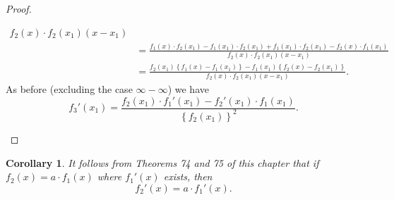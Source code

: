 \documentclass[a4paper,12pt]{book}[2004/02/16]
\providecommand{\colorbox}[2]{#2}
\newcommand{\correction}[2]{\colorbox{corr}{#1}}
\providecommand{\hyperlink}[2]{#2}
\theoremstyle{ilemma}
\theoremstyle{itheorem}
\theoremstyle{iother}
\theoremstyle{icorollary}
\newtheorem{corollary}{Corollary}
\theoremstyle{numcorollary}
\theoremstyle{idefinition}
\begin{document}
\begin{proof}
\begin{enumerate}
\begin{align*}
       {f_2(x)\cdot f_2(x_1) (x-x_1)}
\\
  &= \frac{f_1(x )\cdot f_2(x_1)-f_1(x_1)\cdot f_2(x_1)
       + f_1(x_1)\cdot f_2(x_1)-f_2(x )\cdot f_1(x_1)}
       {f_2(x)\cdot f_2(x_1) (x-x_1)}
\\
  &= \frac{f_2(x_1) \left\{f_1(x)-f_1(x_1) \right\}
      -f_1(x_1) \left\{ f_2(x)-f_2(x_1) \right\}}
       {f_2(x)\cdot f_2(x_1) (x-x_1)}.
\end{align*}
As before (excluding the case $\infty-\infty$) we have
\[
  f_3'(x_1)
= \frac{f_2(x_1)\cdot f_1'(x_1)-f_2'(x_1) \cdot f_1(x_1)}
       {\left\{ f_2(x_1) \right\}^2 }\text{\correction{.}{,}}
\]
\end{enumerate}
\end{proof}

\begin{corollary}
It follows from Theorems \hyperlink{thm74}{74} and \hyperlink{thm75}{75} of this chapter that if
$f_2(x)=a\cdot f_1(x)$ where $f_1'(x)$ exists, then
\[
  f_2'(x)=a\cdot f_1'(x).
\]
\end{corollary}
\end{document}
